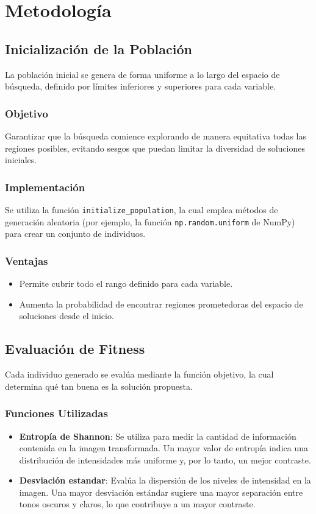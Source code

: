 \chapter{Metodolog\'ia}

\section{Inicializaci\'on de la Poblaci\'on}
La poblaci\'on inicial se genera de forma uniforme a lo largo del espacio de b\'usqueda, definido por l\'imites inferiores y superiores para cada variable.

\subsection*{Objetivo}
Garantizar que la b\'usqueda comience explorando de manera equitativa todas las regiones posibles, evitando sesgos que puedan limitar la diversidad de soluciones iniciales.

\subsection*{Implementaci\'on}
Se utiliza la funci\'on \texttt{initialize\_population}, la cual emplea m\'etodos de generaci\'on aleatoria (por ejemplo, la funci\'on \texttt{np.random.uniform} de NumPy) para crear un conjunto de individuos.

\subsection*{Ventajas}
\begin{itemize}
    \item Permite cubrir todo el rango definido para cada variable.
    \item Aumenta la probabilidad de encontrar regiones prometedoras del espacio de soluciones desde el inicio.
\end{itemize}

\section{Evaluaci\'on de Fitness}

Cada individuo generado se eval\'ua mediante la funci\'on objetivo, la cual determina qu\'e tan buena es la soluci\'on propuesta.

\subsection*{Funciones Utilizadas}
\begin{itemize}
    \item \textbf{Entrop\'ia de Shannon}: Se utiliza para medir la cantidad de informaci\'on contenida en la imagen transformada. Un mayor valor de entrop\'ia indica una distribuci\'on de intensidades m\'as uniforme y, por lo tanto, un mejor contraste.
    \item \textbf{Desviaci\'on estandar}: Eval\'ua la dispersi\'on de los niveles de intensidad en la imagen. Una mayor desviaci\'on estándar sugiere una mayor separaci\'on entre tonos oscuros y claros, lo que contribuye a un mayor contraste.
\end{itemize}

